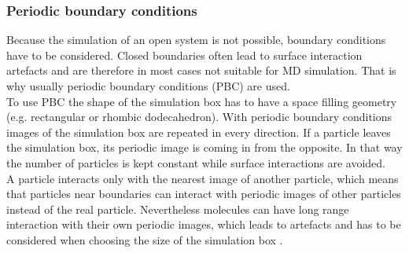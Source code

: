 \subsubsection{Periodic boundary conditions}
\label{subsec:pbc}
Because the simulation of an open system is not possible, boundary conditions have to be considered. Closed boundaries often lead to surface interaction artefacts and are therefore in most cases not suitable for MD simulation. That is why usually periodic boundary conditions (PBC) are used.\\
To use PBC the shape of the simulation box has to have a space filling geometry (e.g. rectangular or rhombic dodecahedron). With periodic boundary conditions images of the simulation box are repeated in every direction. If a particle leaves the simulation box, its periodic image is coming in from the opposite. In that way the number of particles is kept constant while surface interactions are avoided.\\
A particle interacts only with the nearest image of another particle, which means that particles near boundaries can interact with periodic images of other particles instead of the real particle. Nevertheless molecules can have long range interaction with their own periodic images, which leads to artefacts and has to be considered when choosing the size of the simulation box \autocite[p. 141f]{greenBook}.
